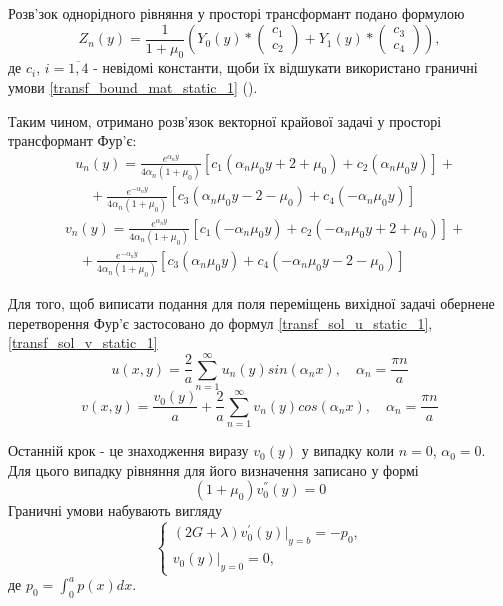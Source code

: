 Розв'зок однорідного рівняння у просторі трансформант подано формулою
\begin{equation}
    Z_n(y) = \frac{1}{1 + \mu_0} \left( Y_0(y) * \begin{pmatrix} c_1 \\ c_2 \end{pmatrix} +  Y_1(y) * \begin{pmatrix} c_3 \\ c_4 \end{pmatrix}  \right),
\end{equation}
де $c_i$, $i=\overline{1, 4}$ - невідомі константи, щоби їх відшукати використано граничні умови \eqref{transf_bound_mat_static_1} ().

Таким чином, отримано розв'язок векторної крайової задачі у просторі трансформант Фур'є:
\begin{align}\label{transf_sol_u_static_1}
    &u_n(y) = \frac{e^{\alpha_n y}}{4 \alpha_n (1 + \mu_0)} \left[c_1 (\alpha_n \mu_0 y + 2 + \mu_0) + c_2 (\alpha_n \mu_0 y) \right] + \nonumber \\
    &\quad + \frac{e^{-\alpha_n y}}{4 \alpha_n (1 + \mu_0)} \left[c_3 (\alpha_n \mu_0 y - 2 - \mu_0) + c_4 (-\alpha_n \mu_0 y)\right]
\end{align}
\begin{align}\label{transf_sol_v_static_1}
    &v_n(y) = \frac{e^{\alpha_n y}}{4 \alpha_n (1 + \mu_0)} \left[c_1 (-\alpha_n \mu_0 y) + c_2 (-\alpha_n \mu_0 y + 2 + \mu_0) \right] + \nonumber \\
    &\quad + \frac{e^{-\alpha_n y}}{4 \alpha_n (1 + \mu_0)} \left[c_3 (\alpha_n \mu_0 y) + c_4 (-\alpha_n \mu_0 y - 2 - \mu_0)\right]
\end{align}

Для того, щоб виписати подання для поля переміщень вихідної задачі обернене перетворення Фур'є застосовано до формул \eqref{transf_sol_u_static_1}, \eqref{transf_sol_v_static_1}
\begin{equation}
    u(x,y) = \frac{2}{a} \sum_{n=1}^{\infty} u_n(y) sin(\alpha_n x), \quad \alpha_n = \frac{\pi n}{a}
\end{equation}
\begin{equation}
    v(x,y) = \frac{v_0(y)}{a} + \frac{2}{a} \sum_{n=1}^{\infty} v_n(y) cos(\alpha_n x), \quad \alpha_n = \frac{\pi n}{a}
\end{equation}

Останній крок - це знаходження виразу $v_0(y)$ у випадку коли $n=0$, $\alpha_0 =0$.
Для цього випадку рівняння для його визначення записано у формі
\begin{equation}\label{transf_v_0_static_1}
    (1 + \mu_0) v_0^{''}(y) = 0
\end{equation}
Граничні умови набувають вигляду
\begin{equation}\label{transf_bound_v_0_static_1}
    \begin{cases}
        (2G + \lambda)v_0^{'}(y)|_{y=b} = -p_0, \\
        v_0(y)|_{y=0} = 0,
    \end{cases}
\end{equation}
де $p_0 = \int_{0}^{a}p(x)dx$.

